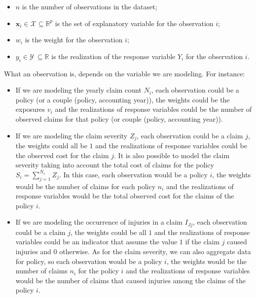 \documentclass[a4paper, nobind]{templates/ociamthesis}
\providecommand{\tightlist}{%
  \setlength{\itemsep}{0pt}\setlength{\parskip}{0pt}}
\theoremstyle{definition}
\theoremstyle{definition}
\theoremstyle{definition}
\theoremstyle{remark}
\begin{document}
\begin{itemize}
\tightlist
\item
  \(n\) is the number of observations in the dataset;
\item
  \(\boldsymbol{x}_i\in \mathcal{X} \subseteq \mathbb{R}^p\) is the set of explanatory variable for the observation \(i\);
\item
  \(w_i\) is the weight for the observation \(i\);
\item
  \(y_i\in \mathcal{Y}\ \subseteq \mathbb{R}\) is the realization of the response variable \(Y_i\) for the observation \(i\).
\end{itemize}

What an observation is, depends on the variable we are modeling. For instance:

\begin{itemize}
\tightlist
\item
  If we are modeling the yearly claim count \(N_i\), each observation could be a policy (or a couple (policy, accounting year)), the weights could be the exposures \(v_i\) and the realizations of response variables could be the number of observed claims for that policy (or couple (policy, accounting year)).
\item
  If we are modeling the claim severity \(Z_j\), each observation could be a claim \(j\), the weights could all be \(1\) and the realizations of response variables could be the observed cost for the claim \(j\). It is also possible to model the claim severity taking into account the total cost of claims for the policy \(S_i = \sum_{j=1}^{N_i}{Z_j}\). In this case, each observation would be a policy \(i\), the weights would be the number of claims for each policy \(n_i\) and the realizations of response variables would be the total observed cost for the claims of the policy \(i\).
\item
  If we are modeling the occurrence of injuries in a claim \(I_{Jj}\), each observation could be a claim \(j\), the weights could be all \(1\) and the realizations of response variables could be an indicator that assume the value \(1\) if the claim \(j\) caused injuries and \(0\) otherwise. As for the claim severity, we can also aggregate data for policy, so each observation would be a policy \(i\), the weights would be the number of claims \(n_i\) for the policy \(i\) and the realizations of response variables would be the number of claims that caused injuries among the claims of the policy \(i\).
\end{itemize}
\end{document}
